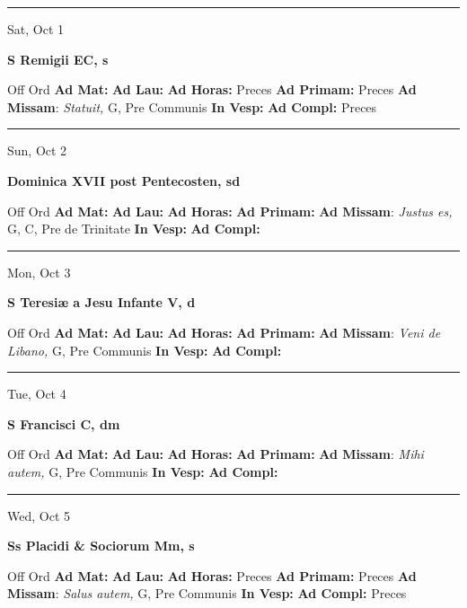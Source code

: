 \documentclass[letterpaper, 10pt]{article}
\begin{document}
\hrule
\begin{center}
Sat, Oct 1
\end{center}\textbf{ \large S Remigii EC, \textnormal{\normalsize s}}
\begin{justify}
Off Ord
\textbf{Ad Mat: }
\textbf{Ad Lau: }
\textbf{Ad Horas: }Preces
\textbf{Ad Primam: }Preces
\textbf{Ad Missam}: \textit{Statuit,} G, Pre Communis
\textbf{In Vesp: }
\textbf{Ad Compl: }Preces\end{justify}



\hrule
\begin{center}
Sun, Oct 2
\end{center}\textbf{ \large Dominica XVII post Pentecosten, \textnormal{\normalsize sd}}
\begin{justify}
Off Ord
\textbf{Ad Mat: }
\textbf{Ad Lau: }
\textbf{Ad Horas: }
\textbf{Ad Primam: }
\textbf{Ad Missam}: \textit{Justus es,} G, C, Pre de Trinitate
\textbf{In Vesp: }
\textbf{Ad Compl: }\end{justify}



\hrule
\begin{center}
Mon, Oct 3
\end{center}\textbf{ \large S Teresiæ a Jesu Infante V, \textnormal{\normalsize d}}
\begin{justify}
Off Ord
\textbf{Ad Mat: }
\textbf{Ad Lau: }
\textbf{Ad Horas: }
\textbf{Ad Primam: }
\textbf{Ad Missam}: \textit{Veni de Libano,} G, Pre Communis
\textbf{In Vesp: }
\textbf{Ad Compl: }\end{justify}



\hrule
\begin{center}
Tue, Oct 4
\end{center}\textbf{ \large S Francisci C, \textnormal{\normalsize dm}}
\begin{justify}
Off Ord
\textbf{Ad Mat: }
\textbf{Ad Lau: }
\textbf{Ad Horas: }
\textbf{Ad Primam: }
\textbf{Ad Missam}: \textit{Mihi autem,} G, Pre Communis
\textbf{In Vesp: }
\textbf{Ad Compl: }\end{justify}



\hrule
\begin{center}
Wed, Oct 5
\end{center}\textbf{ \large Ss Placidi \& Sociorum Mm, \textnormal{\normalsize s}}
\begin{justify}
Off Ord
\textbf{Ad Mat: }
\textbf{Ad Lau: }
\textbf{Ad Horas: }Preces
\textbf{Ad Primam: }Preces
\textbf{Ad Missam}: \textit{Salus autem,} G, Pre Communis
\textbf{In Vesp: }
\textbf{Ad Compl: }Preces\end{justify}
\end{document}
